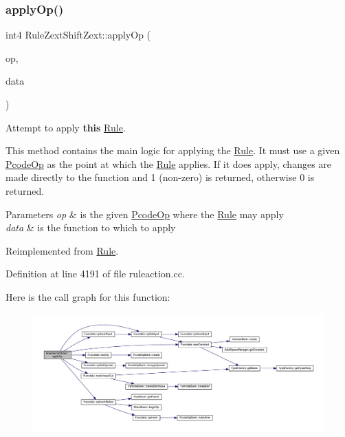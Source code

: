 \subsubsection{\texorpdfstring{applyOp()}{applyOp()}}
{\footnotesize\ttfamily int4 Rule\+Zext\+Shift\+Zext\+::apply\+Op (\begin{DoxyParamCaption}\item[{\mbox{\hyperlink{class_pcode_op}{Pcode\+Op}} $\ast$}]{op,  }\item[{\mbox{\hyperlink{class_funcdata}{Funcdata}} \&}]{data }\end{DoxyParamCaption})\hspace{0.3cm}{\ttfamily [virtual]}}



Attempt to apply {\bfseries{this}} \mbox{\hyperlink{class_rule}{Rule}}. 

This method contains the main logic for applying the \mbox{\hyperlink{class_rule}{Rule}}. It must use a given \mbox{\hyperlink{class_pcode_op}{Pcode\+Op}} as the point at which the \mbox{\hyperlink{class_rule}{Rule}} applies. If it does apply, changes are made directly to the function and 1 (non-\/zero) is returned, otherwise 0 is returned. 
\begin{DoxyParams}{Parameters}
{\em op} & is the given \mbox{\hyperlink{class_pcode_op}{Pcode\+Op}} where the \mbox{\hyperlink{class_rule}{Rule}} may apply \\
\hline
{\em data} & is the function to which to apply \\
\hline
\end{DoxyParams}


Reimplemented from \mbox{\hyperlink{class_rule_a4e3e61f066670175009f60fb9dc60848}{Rule}}.



Definition at line 4191 of file ruleaction.\+cc.

Here is the call graph for this function\+:
\nopagebreak
\begin{figure}[H]
\begin{center}
\leavevmode
\includegraphics[width=350pt]{class_rule_zext_shift_zext_af3714cc3a4c7d45605a720c076802f98_cgraph}
\end{center}
\end{figure}
\mbox{\label{class_rule_zext_shift_zext_ab25e32db23f550a5e97561ce7e6c4ca0}} 
